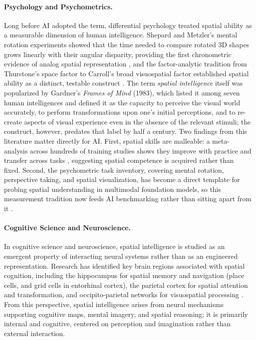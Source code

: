 \paragraph{Psychology and Psychometrics.}
Long before AI adopted the term, differential psychology treated spatial ability as a measurable dimension of human intelligence.
Shepard and Metzler's mental rotation experiments showed that the time needed to compare rotated 3D shapes grows linearly with their angular disparity, providing the first chronometric evidence of analog spatial representation \cite{shepard1971mental}, and the factor-analytic tradition from Thurstone's space factor to Carroll's broad visuospatial factor established spatial ability as a distinct, testable construct \cite{carroll1993human}.
The term \emph{spatial intelligence} itself was popularized by Gardner's \emph{Frames of Mind} (1983), which listed it among seven human intelligences and defined it as the capacity to perceive the visual world accurately, to perform transformations upon one's initial perceptions, and to re-create aspects of visual experience even in the absence of the relevant stimuli; the construct, however, predates that label by half a century.
Two findings from this literature matter directly for AI.
First, spatial skills are malleable: a meta-analysis across hundreds of training studies shows they improve with practice and transfer across tasks \cite{uttal2013malleability}, suggesting spatial competence is acquired rather than fixed.
Second, the psychometric task inventory, covering mental rotation, perspective taking, and spatial visualization, has become a direct template for probing spatial understanding in multimodal foundation models, so this measurement tradition now feeds AI benchmarking rather than sitting apart from it \cite{yang2025vsibench}.

\paragraph{Cognitive Science and Neuroscience.}
In cognitive science and neuroscience, spatial intelligence is studied as an emergent property of interacting neural systems rather than as an engineered representation.
Research has identified key brain regions associated with spatial cognition, including the hippocampus for spatial memory and navigation (place cells, and grid cells in entorhinal cortex), the parietal cortex for spatial attention and transformation, and occipito-parietal networks for visuospatial processing \cite{o1978hippocampus,stachenfeld2017hippocampus}.
From this perspective, spatial intelligence arises from neural mechanisms supporting cognitive maps, mental imagery, and spatial reasoning; it is primarily internal and cognitive, centered on perception and imagination rather than external interaction.


